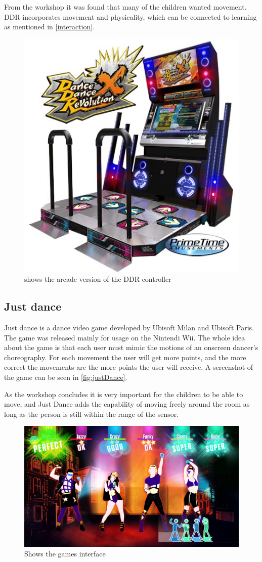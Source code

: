 From the workshop it was found that many of the children wanted movement. DDR incorporates movement and physicality, which can be connected to learning as mentioned in \autoref{interaction}.
\begin{figure}[H]
	\centering
	\includegraphics[width=0.7\linewidth]{figure/Analysis/dancedance}
	\caption{shows the arcade version of the DDR controller}
	\label{fig:dancedance}
\end{figure}

\subsection{Just dance}
Just dance is a dance video game developed by Ubisoft Milan and Ubisoft Paris. The game was released mainly for usage on the Nintendi Wii. The whole idea about the game is that each user must mimic the motions of an onscreen dancer’s choreography. For each movement the user will get more points, and the more correct the movements are the more points the user will receive. A screenshot of the game can be seen in \autoref{fig:justDance}.

As the workshop concludes it is very important for the children to be able to move, and Just Dance adds the capability of moving freely around the room as long as the person is still within the range of the sensor.

\begin{figure}[H]
	\centering
	\includegraphics[width=0.7\linewidth]{figure/Analysis/justdance}
	\caption{Shows the games interface}
	\label{fig:justDance}
\end{figure}

